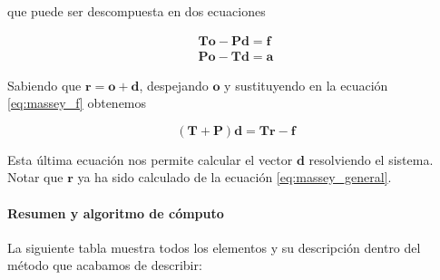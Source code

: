que puede ser descompuesta en dos ecuaciones

\begin{eqnarray}
\mathbf{T o} - \mathbf{P d} = \mathbf{f}\\ \label{eq:massey_f}
\mathbf{P o} - \mathbf{T d} = \mathbf{a} \label{eq:massey}
\end{eqnarray} 

Sabiendo que $\mathbf{r} = \mathbf{o} + \mathbf{d}$, despejando $\mathbf{o}$ y sustituyendo en la ecuación \ref{eq:massey_f} obtenemos

\begin{equation}
(\mathbf{T} + \mathbf{P})\mathbf{d} = \mathbf{T r} - \mathbf{f} \label{eq:massey_d}
\end{equation}

Esta última ecuación nos permite calcular el vector $\mathbf{d}$ resolviendo el sistema. Notar que $\mathbf{r}$ ya ha sido calculado de la ecuación \ref{eq:massey_general}.


\paragraph*{Resumen y algoritmo de cómputo}

La siguiente tabla muestra todos los elementos y su descripción dentro del método que acabamos de describir:

